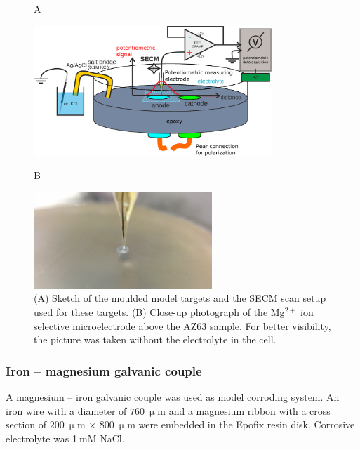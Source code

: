 \begin{figure}
\centering

\begin{flushleft}
\hspace{1.5cm} A
\end{flushleft}

\includegraphics[width=0.8\textwidth]{img/model.eps}\vspace{5mm}

\begin{flushleft}
\hspace{1.5cm} B
\end{flushleft}

\includegraphics[width=0.6\textwidth]{img/model_photo.jpg}
\caption[Sketch of the moulded model targets and the SECM scan setup used for these targets.]{(A) Sketch of the moulded model targets and the SECM scan setup used for these targets. (B) Close-up photograph of the Mg$^{2+}$ ion selective microelectrode above the AZ63 sample. For better visibility, the picture was taken without the electrolyte in the cell.}
\label{fig:model}
\end{figure}

			\subsubsection{Iron -- magnesium galvanic couple}
A magnesium -- iron galvanic couple was used as model corroding system.
An iron wire with a diameter of $760~\upmu$m and a magnesium ribbon with a cross section of $200~\upmu$m $\times$ $800~\upmu$m were embedded in the Epofix resin disk.
Corrosive electrolyte was 1$~$mM NaCl.

